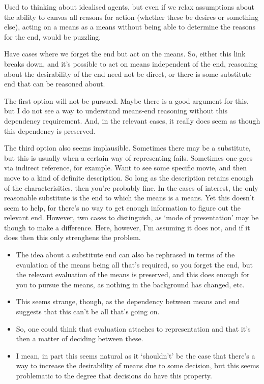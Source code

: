 \documentclass[10pt]{article}
\begin{document}
Used to thinking about idealised agents, but even if we relax assumptions about the ability to canvas all reasons for action (whether these be desires or something else), acting on a means as a means without being able to determine the reasons for the end, would be puzzling.

Have cases where we forget the end but act on the means.
So, either this link breaks down, and it's possible to act on means independent of the end, reasoning about the desirability of the end need not be direct, or there is some substitute end that can be reasoned about.

The first option will not be pursued.
Maybe there is a good argument for this, but I do not see a way to understand means-end reasoning without this dependency requirement.
And, in the relevant cases, it really does seem as though this dependency is preserved.

The third option also seems implausible.
Sometimes there may be a substitute, but this is usually when a certain way of representing fails.
Sometimes one goes via indirect reference, for example.
Want to see some specific movie, and then move to a kind of definite description.
So long as the description retains enough of the characterisitics, then you're probably fine.
In the cases of interest, the only reasonable substitute is the end to which the means is a means.
Yet this doesn't seem to help, for there's no way to get enough information to figure out the relevant end.
However, two cases to distinguish, as `mode of presentation' may be though to make a difference.
Here, however, I'm assuming it does not, and if it does then this only strenghens the problem.
\begin{itemize}
\item The idea about a substitute end can also be rephrased in terms of the evaulation of the means being all that's required, so you forget the end, but the relevant evaluation of the means is preserved, and this does enough for you to pursue the means, as nothing in the background has changed, etc.
\item This seems strange, though, as the dependency between means and end suggests that this can't be all that's going on.
\item So, one could think that evaluation attaches to representation and that it's then a matter of deciding between these.
\item I mean, in part this seems natural as it `shouldn't' be the case that there's a way to increase the desirability of means due to some decision, but this seems problematic to the degree that decisions do have this property.
\end{itemize}
\end{document}
